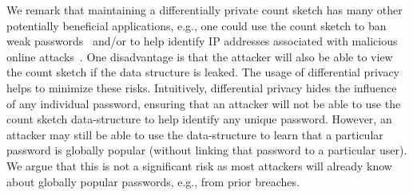 We remark that maintaining a differentially private count sketch has many other potentially beneficial applications, e.g., one could use the count sketch to ban weak passwords~\cite{HTS:SchHerMit10} and/or to help identify IP addresses associated with malicious online attacks~\cite{EuroSP:THS19}. One disadvantage is that the attacker will also be able to view the count sketch if the data structure is leaked. The usage of differential privacy helps to minimize these risks. Intuitively, differential privacy hides the influence of any individual password, ensuring that an attacker will not be able to use the count sketch data-structure to help identify any unique password. However, an attacker may still be able to use the data-structure to learn that a particular password is globally popular (without linking that password to a particular user). We argue that this is not a significant risk as most attackers will already know about globally popular passwords, e.g., from prior breaches. 















